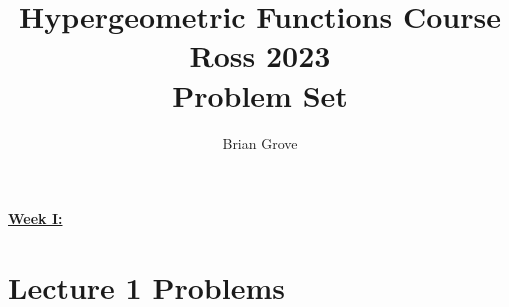 \documentclass[12pt]{amsart}
\theoremstyle{definition}
\theoremstyle{remark}
\numberwithin{equation}{section}
\begin{document}
\title{Hypergeometric Functions Course \\ Ross 2023 \\ Problem Set}

\author{Brian Grove}



\maketitle

\begin{center}
\large\textbf{\underline{Week I:}}
\end{center}

\vspace{8mm}

\section*{Lecture 1 Problems}
\end{document}
